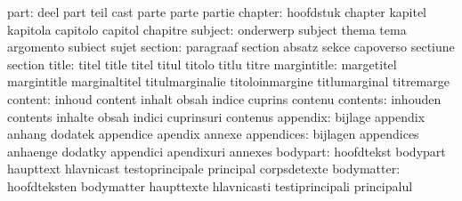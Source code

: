                      part: deel                      part
                           teil                      cast
                           parte                     parte
                           partie
                  chapter: hoofdstuk                 chapter
                           kapitel                   kapitola
                           capitolo                  capitol
                           chapitre
                  subject: onderwerp                 subject
                           thema                     tema
                           argomento                 subiect
                           sujet
                  section: paragraaf                 section
                           absatz                    sekce
                           capoverso                 sectiune
                           section
                    title: titel                     title
                           titel                     titul
                           titolo                    titlu
                           titre
              margintitle: margetitel                margintitle
                           marginaltitel             titulmarginalie
                           titoloinmargine           titlumarginal
                           titremarge
                  content: inhoud                    content
                           inhalt                    obsah
                           indice                    cuprins
                           contenu
                 contents: inhouden                  contents
                           inhalte                   obsah
                           indici                    cuprinsuri
                           contenus
                 appendix: bijlage                   appendix
                           anhang                    dodatek
                           appendice                 apendix
                           annexe
               appendices: bijlagen                  appendices
                           anhaenge                  dodatky
                           appendici                 apendixuri
                           annexes
                 bodypart: hoofdtekst                bodypart
                           haupttext                 hlavnicast
                           testoprincipale           principal
                           corpsdetexte
               bodymatter: hoofdteksten              bodymatter
                           haupttexte                hlavnicasti
                           testiprincipali           principalul
